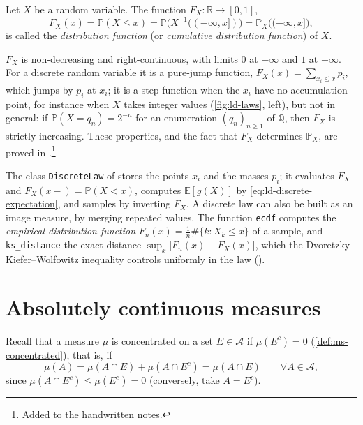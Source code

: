 \begin{definition}\label{def:ld-cdf}
Let $X$ be a random variable. The function $F_X:\mathbb R\to[0,1]$,
\[
  F_X(x)=\mathbb P(X\le x)=\mathbb P\big(X^{-1}((-\infty,x])\big)=\mathbb P_X\big((-\infty,x]\big),
\]
is called the \emph{distribution function} (or \emph{cumulative distribution function}) of
$X$.
\end{definition}

$F_X$ is non-decreasing and right-continuous, with limits $0$ at $-\infty$ and $1$ at
$+\infty$. For a discrete random variable it is a pure-jump function, $F_X(x)=\sum_{x_i\le x}p_i$,
which jumps by $p_i$ at $x_i$; it is a step function when the $x_i$ have no accumulation point,
for instance when $X$ takes integer values (\cref{fig:ld-laws}, left), but not in general: if
$\mathbb P(X=q_n)=2^{-n}$ for an enumeration $(q_n)_{n\ge1}$ of $\mathbb Q$, then $F_X$ is strictly
increasing. These properties, and the fact that $F_X$ determines $\mathbb P_X$,
are proved in .\footnote{Added to the handwritten notes.}

\begin{remark}[Computational]\label{rem:ld-discrete-code}
The class \texttt{DiscreteLaw} of  stores the points $x_i$ and
the masses $p_i$; it evaluates $F_X$ and $F_X(x-)=\mathbb P(X<x)$, computes
$\mathbb E[g(X)]$ by \eqref{eq:ld-discrete-expectation}, and samples by inverting $F_X$. A
discrete law can also be built as an image measure, by merging repeated values. The function
\texttt{ecdf} computes the \emph{empirical distribution function} $F_n(x)=\frac1n\#\{k:X_k\le x\}$
of a sample, and \texttt{ks\_distance} the exact distance $\sup_x|F_n(x)-F_X(x)|$, which the
Dvoretzky--Kiefer--Wolfowitz inequality controls uniformly in the law \citep{massart-dkw}
().
\end{remark}


\section{Absolutely continuous measures}\label{sec:ld-ac}

Recall that a measure $\mu$ is concentrated on a set $E\in\mathcal A$ if $\mu(E^c)=0$
(\cref{def:ms-concentrated}), that is, if
\[
  \mu(A)=\mu(A\cap E)+\mu(A\cap E^c)=\mu(A\cap E)\qquad\forall A\in\mathcal A,
\]
since $\mu(A\cap E^c)\le\mu(E^c)=0$ (conversely, take $A=E^c$).

